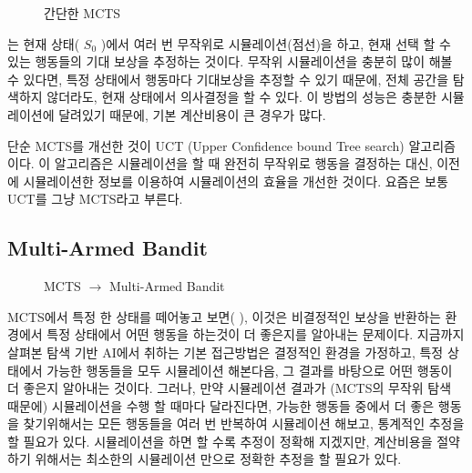 \documentclass[letterpaper,10pt,english]{sphinxmanual}
\begin{document}
\begin{figure}[htbp]
\centering
\capstart

\noindent{}
\caption{간단한 MCTS}\label{\detokenize{04-mcts:simple-mcts}}\label{\detokenize{04-mcts:id6}}\end{figure}

{\hyperref[\detokenize{04-mcts:simple-mcts}]{}} 는 현재 상태( \(S_0\) )에서 여러 번 무작위로 시뮬레이션(점선)을 하고,
현재 선택 할 수 있는 행동들의 기대 보상을 추정하는 것이다.
무작위 시뮬레이션을 충분히 많이 해볼 수 있다면, 특정 상태에서 행동마다 기대보상을 추정할 수 있기 때문에,
전체 공간을 탐색하지 않더라도, 현재 상태에서 의사결정을 할 수 있다.
이 방법의 성능은 충분한 시뮬레이션에 달려있기 때문에, 기본 계산비용이 큰 경우가 많다.

단순 MCTS를 개선한 것이 UCT (Upper Confidence bound Tree search) \sphinxfootnotemark[1] 알고리즘이다. 이 알고리즘은 시뮬레이션을 할 때
완전히 무작위로 행동을 결정하는 대신, 이전에 시뮬레이션한 정보를 이용하여 시뮬레이션의 효율을 개선한 것이다.
요즘은 보통 UCT를 그냥 MCTS라고 부른다.


\subsection{Multi-Armed Bandit}
\label{\detokenize{04-mcts:multi-armed-bandit}}
\begin{figure}[htbp]
\centering
\capstart

\noindent{}
\caption{MCTS \(\rightarrow\) Multi-Armed Bandit}\label{\detokenize{04-mcts:mcts-mab-fig}}\label{\detokenize{04-mcts:id7}}\end{figure}

MCTS에서 특정 한 상태를 떼어놓고 보면( {\hyperref[\detokenize{04-mcts:mcts-mab-fig}]{}} ), 이것은 비결정적인 보상을 반환하는 환경에서 특정 상태에서 어떤 행동을 하는것이
더 좋은지를 알아내는 문제이다. 지금까지 살펴본 탐색 기반 AI에서 취하는 기본 접근방법은 결정적인 환경을 가정하고,
특정 상태에서 가능한 행동들을 모두 시뮬레이션 해본다음, 그 결과를 바탕으로 어떤 행동이 더 좋은지 알아내는 것이다.
그러나, 만약 시뮬레이션 결과가 (MCTS의 무작위 탐색 때문에) 시뮬레이션을 수행 할 때마다 달라진다면,
가능한 행동들 중에서 더 좋은 행동을 찾기위해서는 모든 행동들을 여러 번 반복하여 시뮬레이션 해보고,
통계적인 추정을 할 필요가 있다. 시뮬레이션을 하면 할 수록 추정이 정확해 지겠지만, 계산비용을 절약하기 위해서는
최소한의 시뮬레이션 만으로 정확한 추정을 할 필요가 있다.
\end{document}
